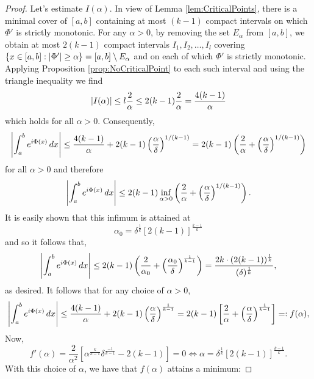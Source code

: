 \documentclass[11pt, letter]{book}
\newcommand{\lp}{\left(}
\newcommand{\rp}{\right)}
\newcommand{\lb}{\left[}
\newcommand{\rb}{\right]}
\newcommand{\f}[2]{\frac{#1}{#2}}
\newcommand{\al}{\alpha}
\begin{document}
\begin{proof}
Let's estimate $I(\al)$. In view of Lemma \ref{lem:CriticalPoints}, there is a minimal cover of $[a,b]$ containing at most $(k-1)$ compact intervals on which $\Phi'$ is strictly monotonic. For any $\alpha>0$, by removing the set $E_\alpha$ from $[a,b]$, we obtain at most $2(k-1)$ compact intervals $I_1,I_2,\dots,I_l$ covering $\{ x\in [a,b] : \abs{\Phi'} \geq\alpha \}=[a,b]\setminus E_\alpha$ and on each of which $\Phi'$ is strictly monotonic. Applying Proposition \ref{prop:NoCriticalPoint} to each such interval and using the triangle inequality we find 
\begin{equation*}
    \abs{I(\alpha)} \leq l\f{2}{\alpha} \leq 2(k-1)\frac{2}{\alpha}= \f{4(k-1)}{\alpha}
\end{equation*}
which holds for all $\alpha>0$. Consequently,
\begin{equation*}
    \abs{\int_a^be^{i\Phi(x)}\,dx}\leq \frac{4(k-1)}{ \alpha}+2(k-1)\left(\frac{\alpha}{\delta}\right)^{1/(k-1)}=2(k-1)\left(\frac{2}{\alpha}+\left(\frac{\alpha}{\delta}\right)^{1/(k-1)}\right)
\end{equation*}
for all $\alpha>0$ and therefore
\begin{equation*}
    \abs{\int_a^b e^{i\Phi(x)}\,dx}\leq 2(k-1)\inf_{\alpha>0}\left(\frac{2}{\alpha}+\left(\frac{\alpha}{\delta}\right)^{1/(k-1)}\right).
\end{equation*}
It is easily shown that this infimum is attained at
\begin{equation*}
    \al_0 = \delta^{\f{1}{k}} [2(k-1)]^{\f{k-1}{k}}
\end{equation*}
and so it follows that,
\begin{equation*}
    \abs{\int_a^b e^{i \Phi(x)} \,dx} \leq 2(k-1)\left( \f{2}{ \alpha_0} +\left(  \f{\al_0}{\delta}\right)^{\f{1}{k-1}}   \right)=\f{2k\cdot (2(k-1))^{\f{1}{k}}}{(\delta)^{\f{1}{k}}},
\end{equation*}
as desired. It follows that for any choice of $\al > 0$,
\begin{equation*}
    \abs{\int_a^b e^{i \Phi(x)} \,dx}  \leq \f{4(k-1)}{\alpha} + 2(k-1)\lp\f{\al}{\delta}\rp^{\f{1}{k-1}} = 2(k-1)\lb \f{2}{ \alpha} +\lp  \f{\al}{\delta}\rp^{\f{1}{k-1}}   \rb =: f(\alpha),
\end{equation*}
Now, 
\begin{equation*}
    f'(\alpha) = \frac{2 }{\alpha ^2  }\left[
     \alpha^{\f{k}{k-1}} \delta^{\f{-1}{k-1}}
    -2(k-1)\right] =  0 \iff \al = \delta^{\f{1}{k}} \lb 2(k-1) \rb^{\f{k-1}{k}} .
\end{equation*}
With this choice of $\al$, we have that $f(\al)$ attains a minimum:

\end{proof}
\end{document}
